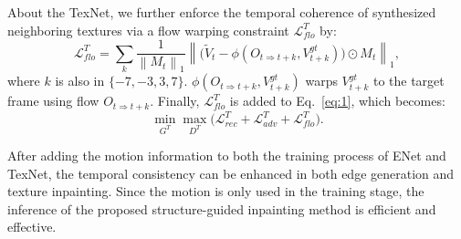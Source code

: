 About the TexNet, we further enforce the temporal coherence of synthesized neighboring textures via a flow warping constraint $\mathcal{L}^T_{flo}$ by: 
\begin{equation}
	\label{eq:inp_flow}
		\mathcal{L}^T_{flo}=\sum_{k}\frac{1}{\left\|M_{t} \right\|_1}\left\|\big(\widetilde{V}_{t}-\phi(O_{t\Rightarrow t+k},V_{t+k}^{gt})\big)\odot M_{t}\right\|_1,
	\end{equation}
where  $k$ is also in $\{-7,-3, 3, 7\}$. $\phi(O_{t\Rightarrow t+k},V_{t+k}^{gt})$ warps $V_{t+k}^{gt}$ to the target frame using flow $O_{t\Rightarrow t+k}$. Finally, $\mathcal{L}^T_{flo}$ is added to Eq.~\eqref{eq:1}, which becomes:
\begin{equation}
\label{eq:1_}
\min\limits_{G^T} \max \limits_{D^T} \big(\mathcal{L}^{T}_{rec}+\mathcal{L}^T_{adv} +\mathcal{L}^T_{flo}\big).
\end{equation}

After adding the motion information to both the training process of ENet and TexNet, the temporal consistency can be enhanced in both edge generation and texture inpainting.
Since the motion is only used in the training stage, the inference of the proposed structure-guided inpainting method is efficient and effective.








	